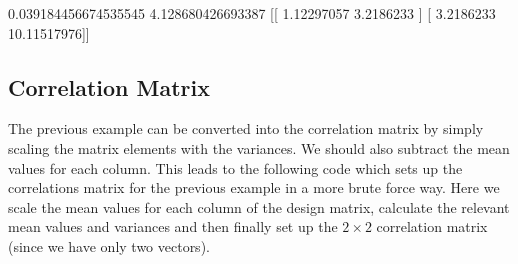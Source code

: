 \documentclass[letterpaper,10pt,english]{sphinxmanual}
\begin{document}
\begin{sphinxVerbatim}[commandchars=\\\{\}]
0.039184456674535545
4.128680426693387
[[ 1.12297057  3.2186233 ]
 [ 3.2186233  10.11517976]]
\end{sphinxVerbatim}


\subsection{Correlation Matrix}
\label{\detokenize{chapter8:correlation-matrix}}
The previous example can be converted into the correlation matrix by
simply scaling the matrix elements with the variances.  We should also
subtract the mean values for each column. This leads to the following
code which sets up the correlations matrix for the previous example in
a more brute force way. Here we scale the mean values for each column of the design matrix, calculate the relevant mean values and variances and then finally set up the \(2\times 2\) correlation matrix (since we have only two vectors).
\end{document}
